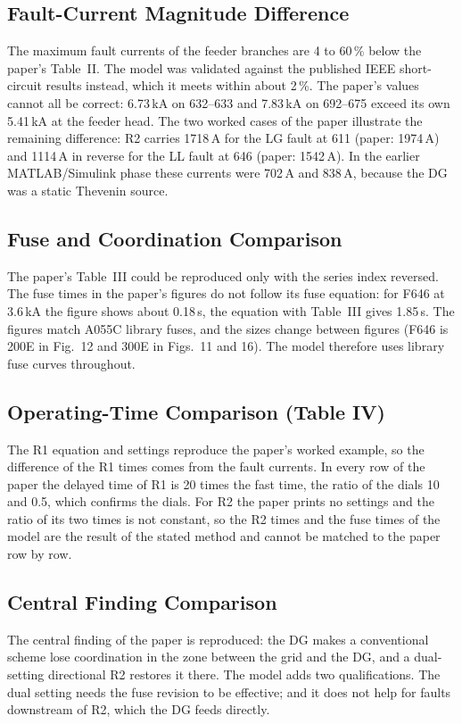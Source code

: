 \documentclass[12pt,letterpaper]{article}
\begin{document}
\subsection{Fault-Current Magnitude Difference}
The maximum fault currents of the feeder branches are 4 to 60\,\% below the paper's Table~II. The model was validated against the
published IEEE short-circuit results instead, which it meets within about 2\,\%. The paper's values cannot
all be correct: 6.73\,kA on 632--633 and 7.83\,kA on 692--675 exceed its own 5.41\,kA at the feeder head. The
two worked cases of the paper illustrate the remaining difference: R2 carries 1718\,A for the LG fault at
611 (paper: 1974\,A) and 1114\,A in reverse for the LL fault at 646 (paper: 1542\,A). In the earlier
MATLAB/Simulink phase these currents were 702\,A and 838\,A, because the DG was a static Thevenin source.

\subsection{Fuse and Coordination Comparison}
The paper's Table~III could be reproduced only with the series index reversed. The fuse times in the paper's
figures do not follow its fuse equation: for F646 at 3.6\,kA the figure shows about 0.18\,s, the equation
with Table~III gives 1.85\,s. The figures match A055C library fuses, and the sizes change between figures
(F646 is 200E in Fig.~12 and 300E in Figs.~11 and 16). The model therefore uses library fuse curves
throughout.

\subsection{Operating-Time Comparison (Table IV)}
The R1 equation and settings reproduce the paper's worked example, so the difference of the R1 times comes
from the fault currents. In every row of the paper the delayed time of R1 is 20 times the fast time, the
ratio of the dials 10 and 0.5, which confirms the dials. For R2 the paper prints no settings and the ratio of
its two times is not constant, so the R2 times and the fuse times of the model are the result of the stated
method and cannot be matched to the paper row by row.

\subsection{Central Finding Comparison}
The central finding of the paper is reproduced: the DG makes a conventional scheme lose coordination in the
zone between the grid and the DG, and a dual-setting directional R2 restores it there. The model adds two
qualifications. The dual setting needs the fuse revision to be effective; and it does not help for faults
downstream of R2, which the DG feeds directly.
\end{document}
